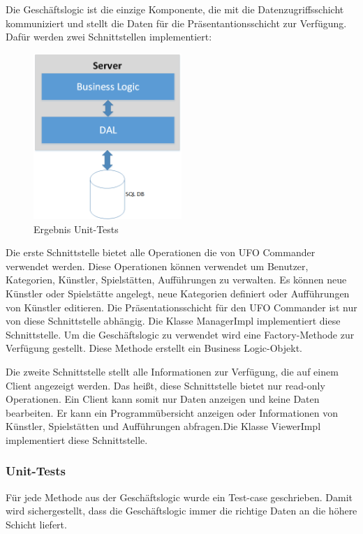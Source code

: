 \documentclass[12pt, a4paper]{article}
\begin{document}
Die Geschäftslogic ist die einzige Komponente, die mit die Datenzugriffsschicht kommuniziert und stellt die Daten für die Präsentantionsschicht zur Verfügung. Dafür werden zwei Schnittstellen implementiert:

\begin{figure}[h] 	
	\centering
		\includegraphics[width=0.5\textwidth]{Server.png}
	\caption{Ergebnis Unit-Tests}
\end{figure}

Die erste Schnittstelle bietet alle Operationen die von UFO Commander verwendet werden. Diese Operationen können verwendet um Benutzer, Kategorien, Künstler, Spielstätten, Aufführungen zu verwalten. 
Es können neue Künstler oder Spielstätte angelegt, neue Kategorien definiert oder Aufführungen von Künstler editieren. Die Präsentationsschicht für den UFO Commander ist nur von diese Schnittstelle abhängig. Die Klasse ManagerImpl implementiert diese Schnittstelle. Um die Geschäftslogic zu verwendet wird eine Factory-Methode zur Verfügung gestellt. Diese Methode erstellt ein Business Logic-Objekt.

Die zweite Schnittstelle stellt alle Informationen zur Verfügung, die auf einem Client angezeigt werden. Das heißt, diese Schnittstelle bietet nur read-only Operationen. Ein Client kann somit nur Daten
anzeigen und keine Daten bearbeiten. Er kann ein Programmübersicht anzeigen oder Informationen von Künstler, Spielstätten und Aufführungen abfragen.Die Klasse ViewerImpl implementiert diese Schnittstelle.

\subsubsection{Unit-Tests}

Für jede Methode aus der Geschäftslogic wurde ein Test-case geschrieben. Damit wird sichergestellt, dass die Geschäftslogic immer die richtige Daten an die höhere Schicht liefert.
\end{document}
